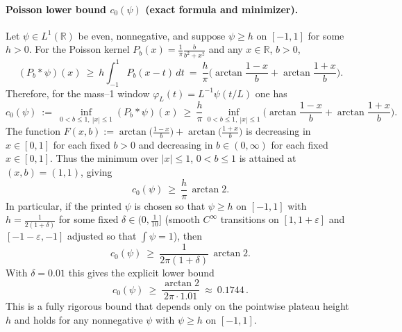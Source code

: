 \documentclass[11pt]{article}
\theoremstyle{definition}
\theoremstyle{remark}
\newcommand{\R}{\mathbb{R}}
\begin{document}
\paragraph{Poisson lower bound $c_0(\psi)$ (exact formula and minimizer).}
Let $\psi\in L^1(\R)$ be even, nonnegative, and suppose $\psi\ge h$ on $[-1,1]$ for some $h>0$. For the Poisson kernel $P_b(x)=\frac{1}{\pi}\frac{b}{b^2+x^2}$ and any $x\in\R$, $b>0$,
\[
 (P_b*\psi)(x)\ \ge\ h\int_{-1}^1 P_b(x-t)\,dt\ =\ \frac{h}{\pi}\Big(\arctan\frac{1-x}{b}+\arctan\frac{1+x}{b}\Big).
\]
Therefore, for the mass--1 window $\varphi_L(t)=L^{-1}\psi(t/L)$ one has
\[
 c_0(\psi)\ :=\ \inf_{0<b\le 1,\ |x|\le 1} (P_b*\psi)(x)\ \ge\ \frac{h}{\pi}\,\inf_{0<b\le 1,\ |x|\le 1}\Big(\arctan\frac{1-x}{b}+\arctan\frac{1+x}{b}\Big).
\]
The function $F(x,b):=\arctan\big(\tfrac{1-x}{b}\big)+\arctan\big(\tfrac{1+x}{b}\big)$ is decreasing in $x\in[0,1]$ for each fixed $b>0$ and decreasing in $b\in(0,\infty)$ for each fixed $x\in[0,1]$. Thus the minimum over $|x|\le 1$, $0<b\le 1$ is attained at $(x,b)=(1,1)$, giving
\[
 c_0(\psi)\ \ge\ \frac{h}{\pi}\,\arctan 2.
\]
In particular, if the printed $\psi$ is chosen so that $\psi\ge h$ on $[-1,1]$ with $h=\tfrac{1}{2(1+\delta)}$ for some fixed $\delta\in(0,\tfrac1{10}]$ (smooth $C^\infty$ transitions on $[1,1+\varepsilon]$ and $[-1-\varepsilon,-1]$ adjusted so that $\int\psi=1$), then
\[
 c_0(\psi)\ \ge\ \frac{1}{2\pi(1+\delta)}\,\arctan 2.
\]
With $\delta=0.01$ this gives the explicit lower bound
\[
 c_0(\psi)\ \ge\ \frac{\arctan 2}{2\pi\cdot 1.01}\ \approx\ 0.1744\,.
\]
This is a fully rigorous bound that depends only on the pointwise plateau height $h$ and holds for any nonnegative $\psi$ with $\psi\ge h$ on $[-1,1]$.
\end{document}
